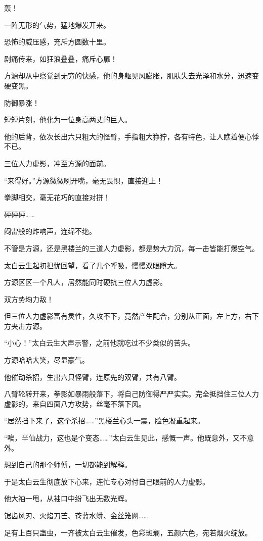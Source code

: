 \begin{this_body}
轰！

一阵无形的气势，猛地爆发开来。

恐怖的威压感，充斥方圆数十里。

剧痛传来，如狂浪叠叠，痛斥心扉！

方源却从中察觉到无穷的快感，他的身躯见风膨胀，肌肤失去光泽和水分，迅速变硬变黑。

防御暴涨！

短短片刻，他化为一位身高两丈的巨人。

他的后背，依次长出六只粗大的怪臂，手指粗大狰狞，各有特色，让人瞧着便心悸不已。

三位人力虚影，冲至方源的面前。

“来得好。”方源微微咧开嘴，毫无畏惧，直接迎上！

拳脚相交，毫无花巧的直接对拼！

砰砰砰……

闷雷般的炸响声，连绵不绝。

不管是方源，还是黑楼兰的三道人力虚影，都是势大力沉，每一击皆能打爆空气。

太白云生起初担忧回望，看了几个呼吸，慢慢双眼瞪大。

方源区区一个凡人，居然能同时硬抗三位人力虚影。

双方势均力敌！

但三位人力虚影富有灵性，久攻不下，竟然产生配合，分别从正面，左上方，右下方夹击方源。

“小心！”太白云生大声示警，之前他就吃过不少类似的苦头。

方源哈哈大笑，尽显豪气。

他催动杀招，生出六只怪臂，连原先的双臂，共有八臂。

八臂轮转开来，拳影如暴雨般落下，将自己防御得严严实实。完全抵挡住三位人力虚影的，来自四面八方攻势，丝毫不落下风。

“居然挡下来了，这个杀招……”黑楼兰心头一震，脸色凝重起来。

“唉，半仙战力，这也是个变态……”太白云生见此，感慨一声。他既意外，又不意外。

想到自己的那个师傅，一切都能到解释。

于是太白云生彻底放下心来，连忙专心对付自己眼前的人力虚影。

他大袖一甩，从袖口中纷飞出无数光辉。

锯齿风刃、火焰刀芒、苍蓝水蟒、金丝笼网……

足有上百只蛊虫，一齐被太白云生催发，色彩斑斓，五颜六色，宛若烟火绽放。


\end{this_body}
